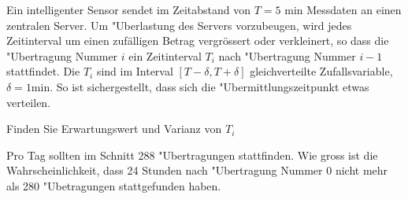 Ein intelligenter Sensor sendet im Zeitabstand von $T=\text{5 min}$
Messdaten an einen zentralen Server. Um "Uberlastung des Servers
vorzubeugen, wird jedes
Zeitinterval um einen zufälligen Betrag vergrössert oder verkleinert, so
dass die "Ubertragung Nummer $i$ ein Zeitinterval $T_i$ nach "Ubertragung
Nummer $i-1$ stattfindet.
Die $T_i$ sind im Interval $[T-\delta,T+\delta]$
gleichverteilte Zufallsvariable, $\delta = \text{1min}$.
So ist sichergestellt, dass sich die "Ubermittlungszeitpunkt etwas verteilen.
\begin{teilaufgaben}
\item Finden Sie Erwartungswert und Varianz von $T_i$
\item Pro Tag sollten im Schnitt 288 "Ubertragungen stattfinden. Wie gross
ist die Wahrscheinlichkeit, dass 24 Stunden nach "Ubertragung Nummer $0$
nicht mehr als 280 "Ubetragungen stattgefunden haben.
\end{teilaufgaben}

